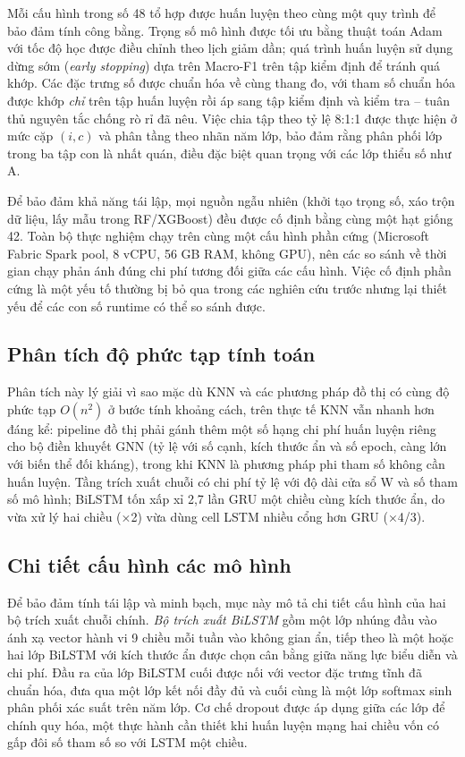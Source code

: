 Mỗi cấu hình trong số 48 tổ hợp được huấn luyện theo cùng một quy trình để bảo đảm tính công bằng. Trọng số mô hình được tối ưu bằng thuật toán Adam với tốc độ học được điều chỉnh theo lịch giảm dần; quá trình huấn luyện sử dụng dừng sớm (\textit{early stopping}) dựa trên Macro-F1 trên tập kiểm định để tránh quá khớp. Các đặc trưng số được chuẩn hóa về cùng thang đo, với tham số chuẩn hóa được khớp \emph{chỉ} trên tập huấn luyện rồi áp sang tập kiểm định và kiểm tra -- tuân thủ nguyên tắc chống rò rỉ đã nêu. Việc chia tập theo tỷ lệ 8:1:1 được thực hiện ở mức cặp $(i, c)$ và phân tầng theo nhãn năm lớp, bảo đảm rằng phân phối lớp trong ba tập con là nhất quán, điều đặc biệt quan trọng với các lớp thiểu số như A.

Để bảo đảm khả năng tái lập, mọi nguồn ngẫu nhiên (khởi tạo trọng số, xáo trộn dữ liệu, lấy mẫu trong RF/XGBoost) đều được cố định bằng cùng một hạt giống 42. Toàn bộ thực nghiệm chạy trên cùng một cấu hình phần cứng (Microsoft Fabric Spark pool, 8 vCPU, 56 GB RAM, không GPU), nên các so sánh về thời gian chạy phản ánh đúng chi phí tương đối giữa các cấu hình. Việc cố định phần cứng là một yếu tố thường bị bỏ qua trong các nghiên cứu trước nhưng lại thiết yếu để các con số runtime có thể so sánh được.

\subsection{Phân tích độ phức tạp tính toán}

Phân tích này lý giải vì sao mặc dù KNN và các phương pháp đồ thị có cùng độ phức tạp $O(n^2)$ ở bước tính khoảng cách, trên thực tế KNN vẫn nhanh hơn đáng kể: pipeline đồ thị phải gánh thêm một số hạng chi phí huấn luyện riêng cho bộ điền khuyết GNN (tỷ lệ với số cạnh, kích thước ẩn và số epoch, càng lớn với biến thể đối kháng), trong khi KNN là phương pháp phi tham số không cần huấn luyện.
Tầng trích xuất chuỗi có chi phí tỷ lệ với độ dài cửa sổ W và số tham số mô hình; BiLSTM tốn xấp xỉ 2,7 lần GRU một chiều cùng kích thước ẩn, do vừa xử lý hai chiều (×2) vừa dùng cell LSTM nhiều cổng hơn GRU (×4/3).

\subsection{Chi tiết cấu hình các mô hình}

Để bảo đảm tính tái lập và minh bạch, mục này mô tả chi tiết cấu hình của hai bộ trích xuất chuỗi chính. \textit{Bộ trích xuất BiLSTM} gồm một lớp nhúng đầu vào ánh xạ vector hành vi 9 chiều mỗi tuần vào không gian ẩn, tiếp theo là một hoặc hai lớp BiLSTM với kích thước ẩn được chọn cân bằng giữa năng lực biểu diễn và chi phí. Đầu ra của lớp BiLSTM cuối được nối với vector đặc trưng tĩnh đã chuẩn hóa, đưa qua một lớp kết nối đầy đủ và cuối cùng là một lớp softmax sinh phân phối xác suất trên năm lớp. Cơ chế dropout được áp dụng giữa các lớp để chính quy hóa, một thực hành cần thiết khi huấn luyện mạng hai chiều vốn có gấp đôi số tham số so với LSTM một chiều.

